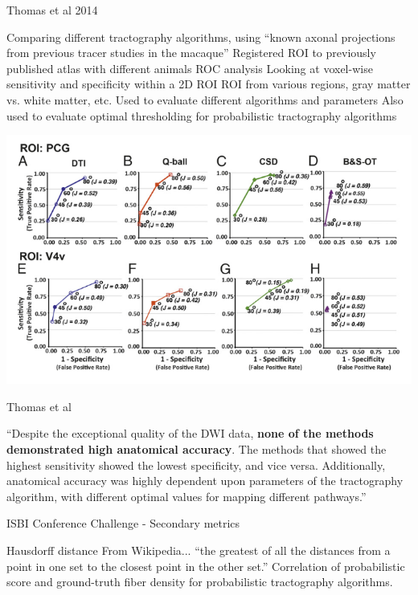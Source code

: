 \documentclass[presentation, 10pt]{beamer}
\begin{document}
\begin{frame}{Thomas et al 2014}

  \begin{outline}
    \1 Comparing different tractography algorithms, using ``known axonal projections from previous tracer studies in the macaque''
    \2 Registered ROI to previously published atlas with different animals
    \1 ROC analysis
    \2 Looking at voxel-wise sensitivity and specificity within a 2D ROI
    \3 ROI from various regions, gray matter vs. white matter, etc.
    \2 Used to evaluate different algorithms and parameters
    \2 Also used to evaluate optimal thresholding for probabilistic tractography algorithms
  \end{outline}

  \centering
  \includegraphics[width=0.5\linewidth]{figs/thomas_roc}
  
\end{frame}

\begin{frame}{Thomas et al}

  \begin{outline}
    \1 ``Despite the exceptional quality of the DWI data, \textbf{none of the methods demonstrated high anatomical accuracy}. The methods that showed the highest sensitivity showed the lowest specificity, and vice versa. Additionally, anatomical accuracy was highly dependent upon parameters of the tractography algorithm, with different optimal values for mapping different pathways.''
  \end{outline}
  
\end{frame}

\begin{frame}{ISBI Conference Challenge - Secondary metrics}

  \begin{outline}
    \1 Hausdorff distance
    \2 From Wikipedia... ``the greatest of all the distances from a point in one set to the closest point in the other set.''
    \1 Correlation of probabilistic score and ground-truth fiber density for probabilistic tractography algorithms. 
  \end{outline}

\end{frame}
\end{document}
